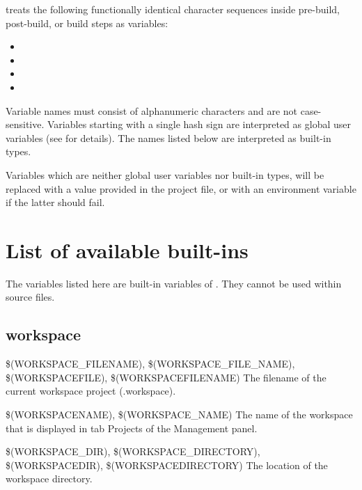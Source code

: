 \codeblocks treats the following functionally identical character sequences inside pre-build, post-build, or build steps as variables:

\begin{itemize}
\item {}
\item {}
\item {}
\item {}
\end{itemize}

Variable names must consist of alphanumeric characters and are not case-sensitive. Variables starting with a single hash sign \codeline{(#)} are interpreted as global user variables (see  for details). The names listed below are interpreted as built-in types.

Variables which are neither global user variables nor built-in types, will be replaced with a value provided in the project file, or with an environment variable if the latter should fail.


\section{List of available built-ins}\label{sec:builtin_variables}

The variables listed here are built-in variables of \codeblocks. They cannot be used within source files.

\subsection{\codeblocks workspace}

\begin{codeentry}
\item[\$(WORKSPACE\_FILENAME), \$(WORKSPACE\_FILE\_NAME), \$(WORKSPACEFILE), \$(WORKSPACEFILENAME)] The filename of the current workspace project (.workspace).
\item[\$(WORKSPACENAME), \$(WORKSPACE\_NAME)] The name of the workspace that is displayed in tab Projects of the Management panel.
\item[\$(WORKSPACE\_DIR), \$(WORKSPACE\_DIRECTORY), \$(WORKSPACEDIR), \$(WORKSPACEDIRECTORY)] The location of the workspace directory.
\end{codeentry}

